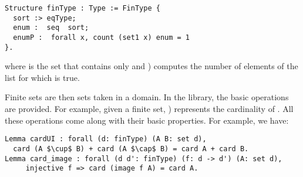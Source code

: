 \begin{lstlisting}
Structure finType : Type := FinType {
  sort :> eqType;
  enum :  seq  sort;
  enumP :  forall x, count (set1 x) enum = 1
}.
\end{lstlisting}
where  is the set that contains only  and 
) computes the number of elements
 of the list  for which  is true.

Finite sets are then sets taken in a  domain. In the library,
the basic operations are provided.
For example, given  a finite set, ) represents the cardinality of .
All these operations come along with their basic properties. For example, we have:
\begin{lstlisting}
Lemma cardUI : forall (d: finType) (A B: set d), 
  card (A $\cup$ B) + card (A $\cap$ B) = card A + card B.
Lemma card_image : forall (d d': finType) (f: d -> d') (A: set d), 
     injective f => card (image f A) = card A.
\end{lstlisting}
